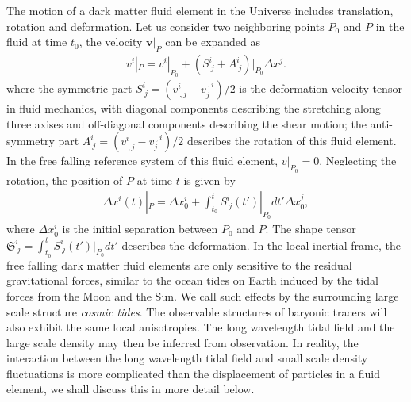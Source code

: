 \documentclass[aps,prd,twocolumn,showpacs,superscriptaddress,groupedaddress,nofootinbib]{revtex4}  %
\begin{document}
The motion of a dark matter fluid element in the Universe includes 
translation, rotation and deformation. 
Let us consider two neighboring points $P_0$ 
and $P$ in the fluid at time $t_0$, the velocity  
$\bm{v}|_{P}$ can be expanded as
\begin{eqnarray}
v^i|_{P}=v^i|_{P_0}+(S^i_{\ j}+A^i_{\ j})|_{P_0}\Delta x^j.
\end{eqnarray}
where the symmetric part $S^i_{\ j}=(v^i_{\ ,j}+v_j^{\ ,i})/2$  is the deformation velocity tensor in fluid 
mechanics, with diagonal components describing the stretching along three
axises and off-diagonal components describing the shear motion;
the anti-symmetry part $A^i_{\ j}=(v^i_{\ ,j}-v_j^{\ ,i})/2$ describes the rotation of this fluid element.
In the free falling reference system of this fluid element, $v|_{P_0}=0$.
Neglecting the rotation,  the position of $P$ at time $t$ is given by 
\begin{eqnarray}
\Delta x^i(t)|_P=\Delta x^i_0+\int_{t_0}^tS^i_{\ j}(t{'})|_{P_0}dt{'}  \Delta x_0^j,
\end{eqnarray}
where $\Delta x_0^i$ is the initial separation between $P_0$ and $P$.
The shape tensor $\mathfrak{S}^i_{\ j}=\int_{t_0}^tS^i_{\ j}(t{'})|_{P_0}dt{'}$ 
describes the deformation. 
In the local inertial frame, the free falling dark matter fluid elements 
are only sensitive to the residual gravitational forces, similar to the 
ocean tides on Earth induced by the tidal forces from the Moon and the Sun.
We call such effects by the surrounding large scale structure {\it cosmic tides}.  
The observable structures of baryonic tracers
 will also exhibit the same local anisotropies. The long wavelength tidal field and the 
large scale density may then be inferred from observation. In reality, the 
interaction between the long wavelength tidal field
and small scale density fluctuations is more complicated than the displacement 
of particles in a fluid element, we shall discuss this in more detail below. 
\end{document}
